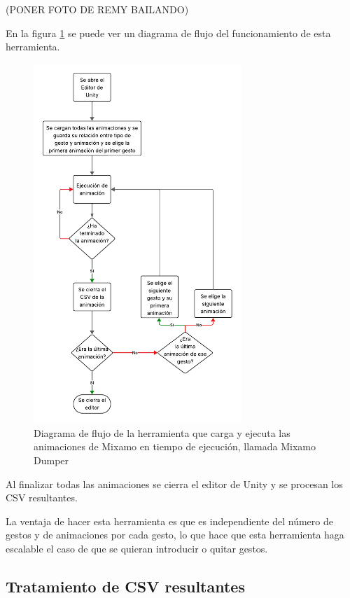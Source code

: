 (PONER FOTO DE REMY BAILANDO)

En la figura \ref{fig:MixamoDumper} se puede ver un diagrama de flujo del funcionamiento de esta herramienta.

\begin{figure}[H]
    \centering
    \includegraphics[width=0.7\textwidth]{Imagenes/Vectorial/FlujoMixamoDumper.pdf}
    \caption{Diagrama de flujo de la herramienta que carga y ejecuta las animaciones de Mixamo en tiempo de ejecución, llamada Mixamo Dumper}
    \label{fig:MixamoDumper}
\end{figure}

Al finalizar todas las animaciones se cierra el editor de Unity y se procesan los CSV resultantes.

La ventaja de hacer esta herramienta es que es independiente del número de gestos y de animaciones por cada gesto, lo que hace que esta herramienta haga escalable el caso de que se quieran introducir o quitar gestos.

\subsection{Tratamiento de CSV resultantes}

